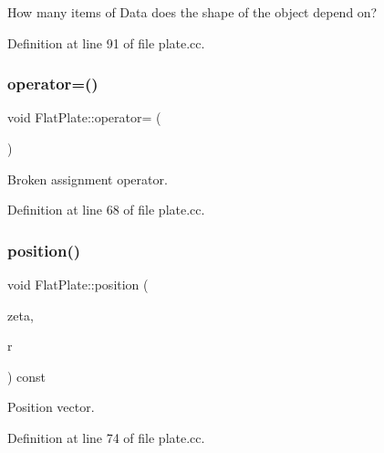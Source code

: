 How many items of Data does the shape of the object depend on? 



Definition at line 91 of file plate.\+cc.

\mbox{\label{classFlatPlate_af1ecfd0cc5b23be30488c8493ada6b2d}} 
\subsubsection{\texorpdfstring{operator=()}{operator=()}}
{\footnotesize\ttfamily void Flat\+Plate\+::operator= (\begin{DoxyParamCaption}\item[{const \hyperlink{classFlatPlate}{Flat\+Plate} \&}]{ }\end{DoxyParamCaption})\hspace{0.3cm}{\ttfamily [inline]}}



Broken assignment operator. 



Definition at line 68 of file plate.\+cc.

\mbox{\label{classFlatPlate_a4a8965c0578bbce8e56f174ae4590012}} 
\subsubsection{\texorpdfstring{position()}{position()}\hspace{0.1cm}{\footnotesize\ttfamily [1/2]}}
{\footnotesize\ttfamily void Flat\+Plate\+::position (\begin{DoxyParamCaption}\item[{const Vector$<$ double $>$ \&}]{zeta,  }\item[{Vector$<$ double $>$ \&}]{r }\end{DoxyParamCaption}) const\hspace{0.3cm}{\ttfamily [inline]}}



Position vector. 



Definition at line 74 of file plate.\+cc.

\mbox{\label{classFlatPlate_ae5e3e3fcf6b8c412865a02a27aeeeaf0}} 
